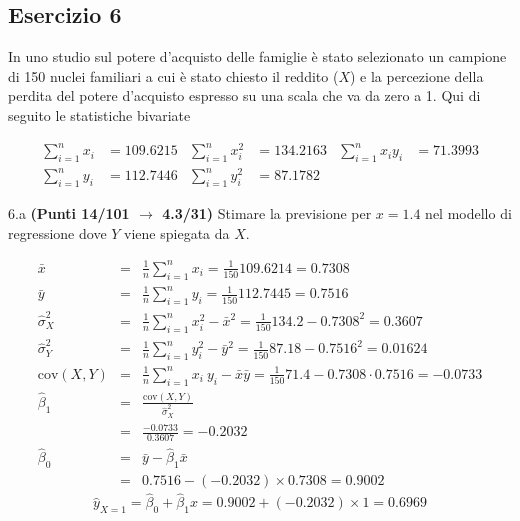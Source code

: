 \documentclass[
  11pt,
]{book}
\theoremstyle{mytheoremstyle}
\theoremstyle{mydefstyle}
\newenvironment{sol}
  {
  \begin{tcolorbox}[enhanced,breakable,arc=0.1mm,boxrule=1pt,colback=white,colframe=iblue,
  title=\bf \fontfamily{lmss}\selectfont \hspace{.5 cm} Soluzione,drop fuzzy shadow]

}{
\end{tcolorbox}
  }
\begin{document}
\subsection{Esercizio 6}\label{esercizio-6-10}

In uno studio sul potere d'acquisto delle famiglie è stato selezionato un campione di 150 nuclei familiari
a cui è stato chiesto il reddito (\(X\)) e la percezione della perdita del potere d'acquisto espresso su una scala che va da zero a 1.
Qui di seguito le statistiche bivariate

\begin{align*}
  \sum_{i=1}^n x_i &= 109.6215 &\sum_{i=1}^n x_i^2 &= 134.2163 &\sum_{i=1}^n x_i y_i &= 71.3993\\
  \sum_{i=1}^n y_i &= 112.7446 & \sum_{i=1}^n y_i^2 &= 87.1782 &
\end{align*}

6.a \textbf{(Punti 14/101 \(\rightarrow\) 4.3/31)} Stimare la previsione per \(x=1.4\) nel modello di regressione dove \(Y\) viene spiegata da \(X\).

\begin{sol}
\begin{eqnarray*}
           \bar x &=&\frac 1 n\sum_{i=1}^n x_i = \frac {1}{ 150 }  109.6214 =  0.7308 \\
           \bar y &=&\frac 1 n\sum_{i=1}^n y_i = \frac {1}{ 150 }  112.7445 =  0.7516 \\
           \hat\sigma_X^2&=&\frac 1 n\sum_{i=1}^n x_i^2-\bar x^2=\frac {1}{ 150 }  134.2  - 0.7308 ^2= 0.3607 \\
           \hat\sigma_Y^2&=&\frac 1 n\sum_{i=1}^n y_i^2-\bar y^2=\frac {1}{ 150 }  87.18  - 0.7516 ^2= 0.01624 \\
           \text{cov}(X,Y)&=&\frac 1 n\sum_{i=1}^n x_i~y_i-\bar x\bar y=\frac {1}{ 150 }  71.4 - 0.7308 \cdot 0.7516 = -0.0733 \\
           \hat\beta_1 &=& \frac{\text{cov}(X,Y)}{\hat\sigma_X^2} \\
                    &=& \frac{ -0.0733 }{ 0.3607 }  =  -0.2032 \\
           \hat\beta_0 &=& \bar y - \hat\beta_1 \bar x\\
                    &=&  0.7516 - (-0.2032) \times  0.7308 = 0.9002 
         \end{eqnarray*}\[\hat y_{X= 1 }=\hat\beta_0+\hat\beta_1 x= 0.9002 + (-0.2032) \times 1 = 0.6969 \]

\end{sol}
\end{document}
